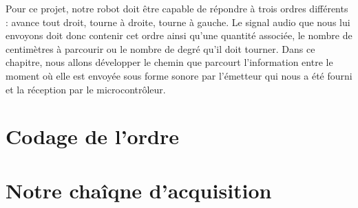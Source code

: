 Pour ce projet, notre robot doit être capable de répondre à trois ordres différents : avance tout droit, tourne à droite, tourne à gauche. Le signal audio que nous lui envoyons doit donc contenir cet ordre ainsi qu'une quantité associée, le nombre de centimètres à parcourir ou le nombre de degré qu'il doit tourner. Dans ce chapitre, nous allons développer le chemin que parcourt l'information entre le moment où elle est envoyée sous forme sonore par l'émetteur qui nous a été fourni et la réception par le microcontrôleur.

\section{Codage de l'ordre}
\section{Notre chaîqne d'acquisition}